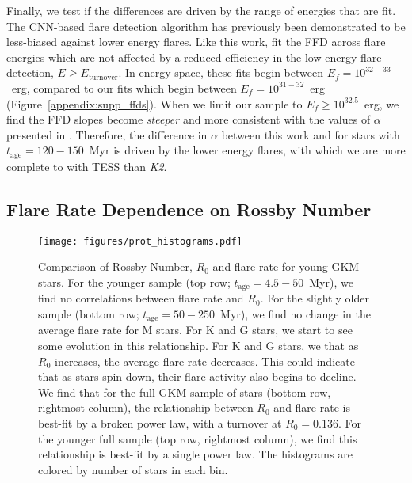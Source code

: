 \documentclass[twocolumn, linenumbers]{aastex631}
\begin{document}
Finally, we test if the differences are driven by the range of energies that are fit. The CNN-based flare detection algorithm has previously been demonstrated to be less-biased against lower
energy flares. Like this work, \cite{ilin21} fit the FFD across flare energies which are not affected by a reduced efficiency in the low-energy flare detection, $E \geq E_\textrm{turnover}$.
In energy space, these fits begin between $E_f = 10^{32-33}$~erg, compared to our fits which begin between $E_f = 10^{31-32}$~erg (Figure~\ref{appendix:supp_ffds}). When we limit our sample
to $E_f \geq 10^{32.5}$~erg, we find the FFD slopes become \textit{steeper} and more consistent with the values of $\alpha$ presented in \cite{ilin21}. Therefore, the difference in $\alpha$
between this work and \cite{ilin21} for stars with $t_\textrm{age} = 120 - 150$~Myr is driven by the lower energy flares, with which we are more complete to with TESS than \textit{K2}.


\subsection{Flare Rate Dependence on Rossby Number}\label{subsec:rossby}

\begin{figure*}[htb!]
    \begin{centering}
        \texttt{[image: figures/prot\_histograms.pdf]}
        \caption{
            Comparison of Rossby Number, $R_0$ and flare rate for young GKM stars. For the younger sample (top row; $t_\textrm{age} = 4.5 - 50$~Myr), we find no correlations between flare
            rate and $R_0$. For the slightly older sample (bottom row; $t_\textrm{age} = 50 - 250$~Myr), we find no change in the average flare rate for M stars. For K and G stars, we start
            to see some evolution in this relationship. For K and G stars, we that as $R_0$ increases, the average flare rate decreases. This could indicate that as stars spin-down, their
            flare activity also begins to decline. We find that for the full GKM sample of stars (bottom row, rightmost column), the relationship between $R_0$ and flare rate is best-fit by
            a broken power law, with a turnover at $R_0 = 0.136$. For the younger full sample (top row, rightmost column), we find this relationship is best-fit by a single power law. The
            histograms are colored by number of stars in each bin.
        }
        \label{fig:prot_histograms}
    \end{centering}
\end{figure*}
\end{document}
